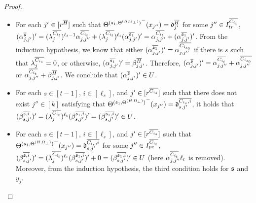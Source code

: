 \begin{appendix}
{\begin{proof}
\begin{itemize}
	\item For each $j' \in [r^{\overline{H}}]$ such that ${\Theta^{({\mathfrak{s} }_1,\Theta^{(H,\Omega_\bot)})}}^-(x_{j''})=\mathfrak{d}^{\overline{H}}_{j'}$ for some $j''  \in I^{\overline{C_{i_t}}}_{tr}$, $(\alpha^{\overline{{\mathfrak{s} }}}_{j, j'})' =(\lambda^{\overline{C_{i_t}}}_{j})^{\ell_t-1} \alpha^{\overline{C_{i_t}}}_{j,j''} + (\lambda^{\overline{C_{i_t}}}_{j})^{\ell_t} (\alpha^{\overline{{\mathfrak{s} }_1}}_{j, j'})' = \alpha^{\overline{C_{i_t}}}_{j,j''} + (\alpha^{\overline{{\mathfrak{s} }_1}}_{j, j'})' $. From the induction hypothesis, we know that either $(\alpha^{\overline{{\mathfrak{s} }_1}}_{j, j'})' = \alpha^{\overline{C_{i_{s_0}}}}_{j,j''}$ if there is $s$ such that $\lambda^{\overline{C_{i_s}}}_j =0$,  or otherwise, $(\alpha^{\overline{{\mathfrak{s} }_1}}_{j, j'})'=\beta^{\overline{H}}_{j, j'}$. Therefore, $(\alpha^{\overline{{\mathfrak{s} }}}_{j, j'})' =\alpha^{\overline{C_{i_t}}}_{j,j''} +  \alpha^{\overline{C_{i_{s_0}}}}_{j,j''}$ or $\alpha^{\overline{C_{i_t}}}_{j,j''}+ \beta^{\overline{H}}_{j, j'}$. We conclude that $(\alpha^{\overline{{\mathfrak{s} }}}_{j, j'})' \in U$.
	\item For each $s \in [t-1]$, $i \in [\ell_s]$, and $j' \in [r^{\overline{C_{i_s}}}]$ such that there does not exist $j'' \in [k]$ satisfying that ${\Theta^{({\mathfrak{s} }_1,\Theta^{(H,\Omega_\bot)})}}^-(x_{j''}) = \mathfrak{d}^{\overline{C_{i_s}, i}}_{s, j'}$, it holds that $(\beta^{\overline{{\mathfrak{s} },i}}_{s,j'})' = (\lambda^{\overline{C_{i_t}}}_{j})^{\ell_t}  (\beta^{\overline{{\mathfrak{s} }_1, i}}_{s, j'})'  =  (\beta^{\overline{{\mathfrak{s} }_1, i}}_{s, j'})'  \in U$. 
	\item For each $s \in [t-1]$, $i \in [\ell_s]$, and $j' \in [r^{\overline{C_{i_s}}}]$ such that ${\Theta^{({\mathfrak{s} }_1,\Theta^{(H,\Omega_\bot)})}}^-(x_{j''}) = \mathfrak{d}^{\overline{C_{i_s}, i}}_{s, j'}$ for some $j'' \in I^{\overline{C_{i_t}}}_{pe}$, $(\beta^{\overline{{\mathfrak{s} },i}}_{s,j'})' =(\lambda^{\overline{C_{i_t}}}_{j})^{\ell_t}  (\beta^{\overline{{\mathfrak{s} }_1, i}}_{s, j'})'+ 0  =  (\beta^{\overline{{\mathfrak{s} }_1, i}}_{s, j'})' \in U$ (here $\alpha^{\overline{C_{i_t}}}_{j, j''} \ell_t$ is removed). Moreover, from the induction hypothesis, the third condition holds for ${\mathfrak{s} }$ and $y_j$.

\end{itemize}
\end{proof}}
\end{appendix}
